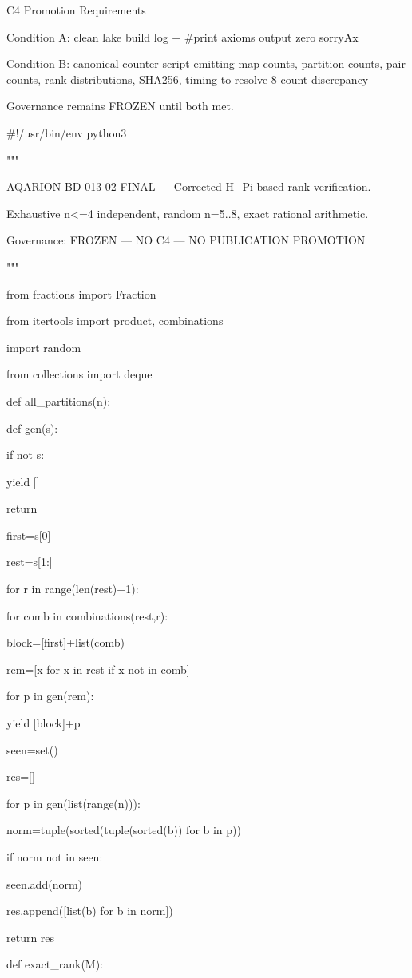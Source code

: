C4 Promotion Requirements

Condition A: clean lake build log + #print axioms output zero sorryAx

Condition B: canonical counter script emitting map counts, partition counts, pair counts, rank distributions, SHA256, timing to resolve 8-count discrepancy






Governance remains FROZEN until both met.


#!/usr/bin/env python3

"""

AQARION BD-013-02 FINAL — Corrected H_Pi based rank verification.

Exhaustive n<=4 independent, random n=5..8, exact rational arithmetic.

Governance: FROZEN — NO C4 — NO PUBLICATION PROMOTION

"""

from fractions import Fraction

from itertools import product, combinations

import random

from collections import deque


def all_partitions(n):

def gen(s):

if not s:

yield []

return

first=s[0]

rest=s[1:]

for r in range(len(rest)+1):

for comb in combinations(rest,r):

block=[first]+list(comb)

rem=[x for x in rest if x not in comb]

for p in gen(rem):

yield [block]+p

seen=set()

res=[]

for p in gen(list(range(n))):

norm=tuple(sorted(tuple(sorted(b)) for b in p))

if norm not in seen:

seen.add(norm)

res.append([list(b) for b in norm])

return res


def exact_rank(M):

